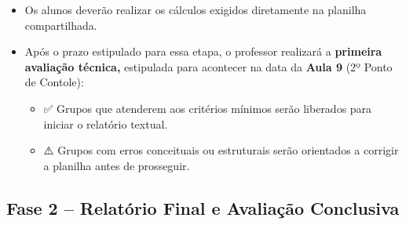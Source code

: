 \documentclass[
  a4paper,
]{book}
\providecommand{\tightlist}{%
  \setlength{\itemsep}{0pt}\setlength{\parskip}{0pt}}\usepackage{longtable,booktabs,array}
\newcommand{\emojitext}[1]{{\emoji #1}}
\begin{document}
\begin{enumerate}
  \begin{itemize}
  \item
    Os alunos deverão realizar os cálculos exigidos diretamente na
    planilha compartilhada.\\
  \item
    Após o prazo estipulado para essa etapa, o professor realizará a
    \textbf{primeira avaliação técnica,} estipulada para acontecer na
    data da \textbf{Aula 9} (2º Ponto de Contole):

    \begin{itemize}
    \tightlist
    \item
      \emojitext{✅} Grupos que atenderem aos critérios mínimos serão
      liberados para iniciar o relatório textual.\\
    \item
      \emojitext{⚠️} Grupos com erros conceituais ou estruturais serão
      orientados a corrigir a planilha antes de prosseguir.
    \end{itemize}
  \end{itemize}
\end{enumerate}

\subsection{Fase 2 -- Relatório Final e Avaliação Conclusiva
📌}\label{fase-2-relatuxf3rio-final-e-avaliauxe7uxe3o-conclusiva}
\end{document}
